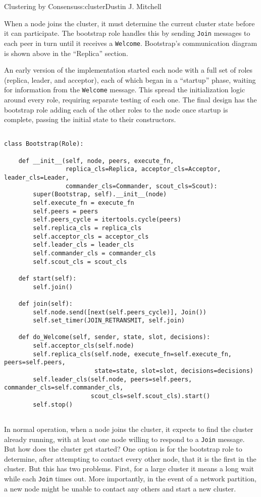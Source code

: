 \begin{aosachapter}{Clustering by Consensus}{s:cluster}{Dustin J. Mitchell}
\label{bootstrap}

When a node joins the cluster, it must determine the current cluster
state before it can participate. The bootstrap role handles this by
sending \texttt{Join} messages to each peer in turn until it receives a
\texttt{Welcome}. Bootstrap's communication diagram is shown above in
the ``Replica'' section.

An early version of the implementation started each node with a full set
of roles (replica, leader, and acceptor), each of which began in a
``startup'' phase, waiting for information from the \texttt{Welcome}
message. This spread the initialization logic around every role,
requiring separate testing of each one. The final design has the
bootstrap role adding each of the other roles to the node once startup
is complete, passing the initial state to their constructors.

\begin{verbatim}

class Bootstrap(Role):

    def __init__(self, node, peers, execute_fn,
                 replica_cls=Replica, acceptor_cls=Acceptor, leader_cls=Leader,
                 commander_cls=Commander, scout_cls=Scout):
        super(Bootstrap, self).__init__(node)
        self.execute_fn = execute_fn
        self.peers = peers
        self.peers_cycle = itertools.cycle(peers)
        self.replica_cls = replica_cls
        self.acceptor_cls = acceptor_cls
        self.leader_cls = leader_cls
        self.commander_cls = commander_cls
        self.scout_cls = scout_cls

    def start(self):
        self.join()

    def join(self):
        self.node.send([next(self.peers_cycle)], Join())
        self.set_timer(JOIN_RETRANSMIT, self.join)

    def do_Welcome(self, sender, state, slot, decisions):
        self.acceptor_cls(self.node)
        self.replica_cls(self.node, execute_fn=self.execute_fn, peers=self.peers,
                         state=state, slot=slot, decisions=decisions)
        self.leader_cls(self.node, peers=self.peers, commander_cls=self.commander_cls,
                        scout_cls=self.scout_cls).start()
        self.stop()
    
\end{verbatim}

\label{seed}

In normal operation, when a node joins the cluster, it expects to find
the cluster already running, with at least one node willing to respond
to a \texttt{Join} message. But how does the cluster get started? One
option is for the bootstrap role to determine, after attempting to
contact every other node, that it is the first in the cluster. But this
has two problems. First, for a large cluster it means a long wait while
each \texttt{Join} times out. More importantly, in the event of a
network partition, a new node might be unable to contact any others and
start a new cluster.


\end{aosachapter}
